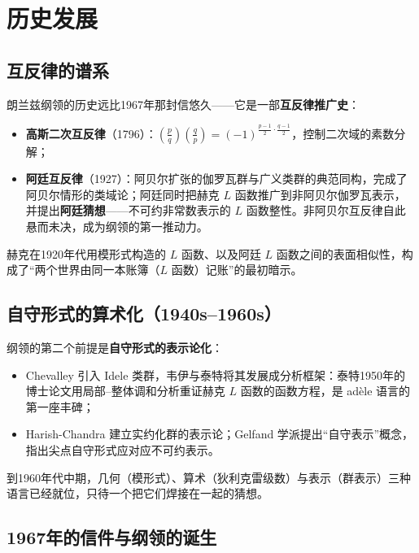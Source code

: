 \section{历史发展}\label{sec:history}

\subsection{互反律的谱系}

朗兰兹纲领的历史远比1967年那封信悠久——它是一部\textbf{互反律推广史}：

\begin{itemize}
    \item \textbf{高斯二次互反律}（1796）：$\left(\frac{p}{q}\right)\left(\frac{q}{p}\right) = (-1)^{\frac{p-1}{2}\cdot\frac{q-1}{2}}$，控制二次域的素数分解；
    \item \textbf{阿廷互反律}（1927）：阿贝尔扩张的伽罗瓦群与广义类群的典范同构，完成了阿贝尔情形的类域论\cite{artin1927}；阿廷同时把赫克 $L$ 函数推广到非阿贝尔伽罗瓦表示，并提出\textbf{阿廷猜想}——不可约非常数表示的 $L$ 函数整性。非阿贝尔互反律自此悬而未决，成为纲领的第一推动力。
\end{itemize}

赫克在1920年代用模形式构造的 $L$ 函数、以及阿廷 $L$ 函数之间的表面相似性，构成了“两个世界由同一本账簿（$L$ 函数）记账”的最初暗示。

\subsection{自守形式的算术化（1940s--1960s）}

纲领的第二个前提是\textbf{自守形式的表示论化}：

\begin{itemize}
    \item Chevalley 引入 Idele 类群，韦伊与泰特将其发展成分析框架：泰特1950年的博士论文\cite{tate1967}用局部--整体调和分析重证赫克 $L$ 函数的函数方程，是 adèle 语言的第一座丰碑；
    \item Harish-Chandra 建立实约化群的表示论；Gelfand 学派提出“自守表示”概念，指出尖点自守形式应对应不可约表示。
\end{itemize}

到1960年代中期，几何（模形式）、算术（狄利克雷级数）与表示（群表示）三种语言已经就位，只待一个把它们焊接在一起的猜想。

\subsection{1967年的信件与纲领的诞生}

